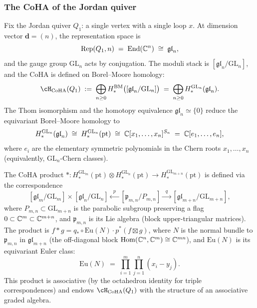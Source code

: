 \subsubsection{The CoHA of the Jordan quiver}
\label{subsubsec:coha-jordan}

Fix the Jordan quiver $Q_1$: a single vertex with a single loop $x$.
At dimension vector $\mathbf{d} = (n)$, the representation space is
\[
 \mathrm{Rep}(Q_1, n) \;=\; \mathrm{End}(\mathbb C^n) \;\cong\; \mathfrak{gl}_n,
\]
and the gauge group $\mathrm{GL}_n$ acts by conjugation. The moduli stack is
$[\mathfrak{gl}_n / \mathrm{GL}_n]$, and the CoHA is defined on Borel--Moore
homology:
\[
 \cH_{\mathrm{CoHA}}(Q_1)
 \;:=\;
 \bigoplus_{n \ge 0}
 H_*^{\mathrm{BM}}\bigl([\mathfrak{gl}_n / \mathrm{GL}_n]\bigr)
 \;=\;
 \bigoplus_{n \ge 0}
 H_*^{\mathrm{GL}_n}(\mathfrak{gl}_n).
\]
The Thom isomorphism and the homotopy equivalence
$\mathfrak{gl}_n \simeq \{0\}$ reduce the equivariant Borel--Moore
homology to
\[
 H_*^{\mathrm{GL}_n}(\mathfrak{gl}_n)
 \;\cong\;
 H_*^{\mathrm{GL}_n}(\mathrm{pt})
 \;\cong\;
 \mathbb C[x_1, \ldots, x_n]^{S_n}
 \;=\;
 \mathbb C[e_1, \ldots, e_n],
\]
where $e_i$ are the elementary symmetric polynomials in the Chern roots
$x_1, \ldots, x_n$ (equivalently, $\mathrm{GL}_n$-Chern classes).

\begin{computation}
\label{comp:coha-product}
The CoHA product
$* \colon H_*^{\mathrm{GL}_m}(\mathrm{pt}) \otimes H_*^{\mathrm{GL}_n}(\mathrm{pt})
\to H_*^{\mathrm{GL}_{m+n}}(\mathrm{pt})$
is defined via the correspondence
\[
 [\mathfrak{gl}_m / \mathrm{GL}_m]
 \times
 [\mathfrak{gl}_n / \mathrm{GL}_n]
 \xleftarrow{\;\;p\;\;}
 [\mathfrak{p}_{m,n} / P_{m,n}]
 \xrightarrow{\;\;q\;\;}
 [\mathfrak{gl}_{m+n} / \mathrm{GL}_{m+n}],
\]
where $P_{m,n} \subset \mathrm{GL}_{m+n}$ is the parabolic subgroup preserving a
flag $0 \subset \mathbb C^m \subset \mathbb C^{m+n}$, and $\mathfrak{p}_{m,n}$ is
its Lie algebra (block upper-triangular matrices). The product is
$f * g = q_* \circ \mathrm{Eu}(N) \cdot p^*(f \boxtimes g)$,
where $N$ is the normal bundle to $\mathfrak{p}_{m,n}$ in
$\mathfrak{gl}_{m+n}$ (the off-diagonal block
$\mathrm{Hom}(\mathbb C^n, \mathbb C^m) \cong \mathbb C^{mn}$), and $\mathrm{Eu}(N)$ is its
equivariant Euler class:
\[
 \mathrm{Eu}(N)
 \;=\;
 \prod_{i=1}^{m}\prod_{j=1}^{n}(x_i - y_j).
\]
This product is associative (by the octahedron identity for
triple correspondences) and endows $\cH_{\mathrm{CoHA}}(Q_1)$
with the structure of an associative graded algebra.
\end{computation}

